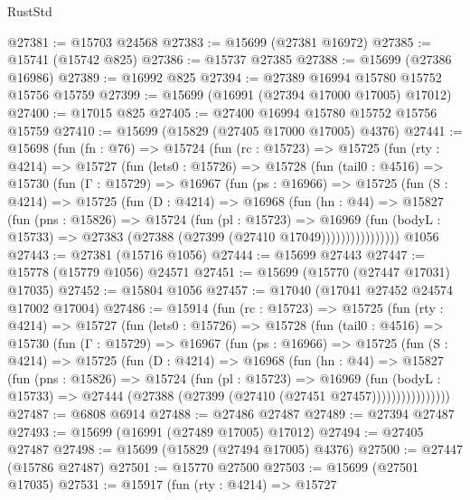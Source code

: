 \begin{lexlean}{RustStd}
\begin{coremodule}
@27381 := @15703 @24568
@27383 := @15699 (@27381 @16972)
@27385 := @15741 (@15742 @825)
@27386 := @15737 @27385
@27388 := @15699 (@27386 @16986)
@27389 := @16992 @825
@27394 := @27389 @16994 @15780 @15752 @15756 @15759
@27399 := @15699 (@16991 (@27394 @17000 @17005) @17012)
@27400 := @17015 @825
@27405 := @27400 @16994 @15780 @15752 @15756 @15759
@27410 := @15699 (@15829 (@27405 @17000 @17005) @4376)
@27441 := @15698
    (fun (fn : @76) =>
    @15724
      (fun (rc : @15723) =>
      @15725
        (fun (rty : @4214) =>
        @15727
          (fun (lets0 : @15726) =>
          @15728
            (fun (tail0 : @4516) =>
            @15730
              (fun (Γ : @15729) =>
              @16967
                (fun (ps : @16966) =>
                @15725
                  (fun (S : @4214) =>
                  @15725
                    (fun (D : @4214) =>
                    @16968
                      (fun (hn : @44) =>
                      @15827
                        (fun (pns : @15826) =>
                        @15724
                          (fun (pl : @15723) =>
                          @16969
                            (fun (bodyL : @15733) =>
                            @27383 (@27388 (@27399 (@27410 @17049))))))))))))))))
    @1056
@27443 := @27381 (@15716 @1056)
@27444 := @15699 @27443
@27447 := @15778 (@15779 @1056) @24571
@27451 := @15699 (@15770 (@27447 @17031) @17035)
@27452 := @15804 @1056
@27457 := @17040 (@17041 @27452 @24574 @17002 @17004)
@27486 := @15914
    (fun (rc : @15723) =>
    @15725
      (fun (rty : @4214) =>
      @15727
        (fun (lets0 : @15726) =>
        @15728
          (fun (tail0 : @4516) =>
          @15730
            (fun (Γ : @15729) =>
            @16967
              (fun (ps : @16966) =>
              @15725
                (fun (S : @4214) =>
                @15725
                  (fun (D : @4214) =>
                  @16968
                    (fun (hn : @44) =>
                    @15827
                      (fun (pns : @15826) =>
                      @15724
                        (fun (pl : @15723) =>
                        @16969
                          (fun (bodyL : @15733) =>
                          @27444 (@27388 (@27399 (@27410 (@27451 @27457))))))))))))))))
@27487 := @6808 @6914
@27488 := @27486 @27487
@27489 := @27394 @27487
@27493 := @15699 (@16991 (@27489 @17005) @17012)
@27494 := @27405 @27487
@27498 := @15699 (@15829 (@27494 @17005) @4376)
@27500 := @27447 (@15786 @27487)
@27501 := @15770 @27500
@27503 := @15699 (@27501 @17035)
@27531 := @15917
    (fun (rty : @4214) =>
    @15727

\end{coremodule}
\end{lexlean}

